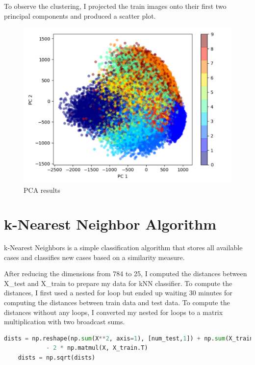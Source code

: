 To observe the clustering, I projected the train images onto their first two
principal components and produced a scatter plot. 

\begin{figure}[H]
    \centering
    \includegraphics[width=\textwidth]{images/pca.png}
    \caption*{PCA results}
    \setlength{\belowcaptionskip}{-40pt}
    \setlength{\abovecaptionskip}{-40pt}
\end{figure}


\section*{k-Nearest Neighbor Algorithm}

k-Nearest Neighbors is a simple classification algorithm that stores all
available cases and classifies new cases based on a similarity measure.

After reducing the dimensions from 784 to 25, I computed the distances between
X\_test and X\_train to prepare my data for kNN classifier. To compute the
distances, I first used a nested for loop but ended up waiting 30 minutes for
computing the distances between train data and test data. To compute the
distances without any loops, I converted my nested for loops to a matrix
multiplication with two broadcast sums.

\begin{lstlisting}[language=Python, caption=Computing the distances without
loops]
    dists = np.reshape(np.sum(X**2, axis=1), [num_test,1]) + np.sum(X_train**2, axis=1) \
            - 2 * np.matmul(X, X_train.T)
    dists = np.sqrt(dists)

\end{lstlisting}

